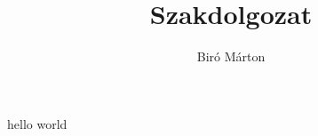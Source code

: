 \documentclass{article}
\begin{document}
\title{Szakdolgozat}
\author{Biró Márton}
hello world
\end{document}
